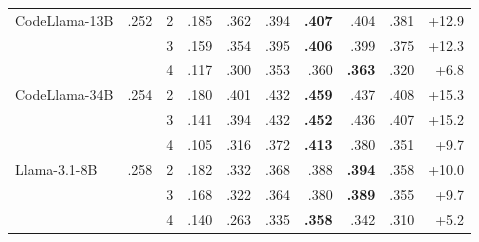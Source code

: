 \begin{table}[!t]
\begin{tabular}{@{}lrrrrrrrrr@{}}
\addlinespace[2pt]

CodeLlama-13B
& .252
& 2
& .185
& \textcolor{green!55!black}{.362}
& \textcolor{green!55!black}{.394}
& \textbf{\textcolor{green!55!black}{.407}}
& \textcolor{green!55!black}{.404}
& \textcolor{green!55!black}{.381}
& \textcolor{green!55!black}{+12.9} \\
&
& 3
& .159
& \textcolor{green!55!black}{.354}
& \textcolor{green!55!black}{.395}
& \textbf{\textcolor{green!55!black}{.406}}
& \textcolor{green!55!black}{.399}
& \textcolor{green!55!black}{.375}
& \textcolor{green!55!black}{+12.3} \\
&
& 4
& .117
& \textcolor{green!55!black}{.300}
& \textcolor{green!55!black}{.353}
& \textcolor{green!55!black}{.360}
& \textbf{\textcolor{green!55!black}{.363}}
& \textcolor{green!55!black}{.320}
& \textcolor{green!55!black}{+6.8} \\

\addlinespace[2pt]

CodeLlama-34B
& .254
& 2
& .180
& \textcolor{green!55!black}{.401}
& \textcolor{green!55!black}{.432}
& \textbf{\textcolor{green!55!black}{.459}}
& \textcolor{green!55!black}{.437}
& \textcolor{green!55!black}{.408}
& \textcolor{green!55!black}{+15.3} \\
&
& 3
& .141
& \textcolor{green!55!black}{.394}
& \textcolor{green!55!black}{.432}
& \textbf{\textcolor{green!55!black}{.452}}
& \textcolor{green!55!black}{.436}
& \textcolor{green!55!black}{.407}
& \textcolor{green!55!black}{+15.2} \\
&
& 4
& .105
& \textcolor{green!55!black}{.316}
& \textcolor{green!55!black}{.372}
& \textbf{\textcolor{green!55!black}{.413}}
& \textcolor{green!55!black}{.380}
& \textcolor{green!55!black}{.351}
& \textcolor{green!55!black}{+9.7} \\

\addlinespace[2pt]

Llama-3.1-8B
& .258
& 2
& .182
& \textcolor{green!55!black}{.332}
& \textcolor{green!55!black}{.368}
& \textcolor{green!55!black}{.388}
& \textbf{\textcolor{green!55!black}{.394}}
& \textcolor{green!55!black}{.358}
& \textcolor{green!55!black}{+10.0} \\
&
& 3
& .168
& \textcolor{green!55!black}{.322}
& \textcolor{green!55!black}{.364}
& \textcolor{green!55!black}{.380}
& \textbf{\textcolor{green!55!black}{.389}}
& \textcolor{green!55!black}{.355}
& \textcolor{green!55!black}{+9.7} \\
&
& 4
& .140
& \textcolor{green!55!black}{.263}
& \textcolor{green!55!black}{.335}
& \textbf{\textcolor{green!55!black}{.358}}
& \textcolor{green!55!black}{.342}
& \textcolor{green!55!black}{.310}
& \textcolor{green!55!black}{+5.2} \\


\end{tabular}
\end{table}
